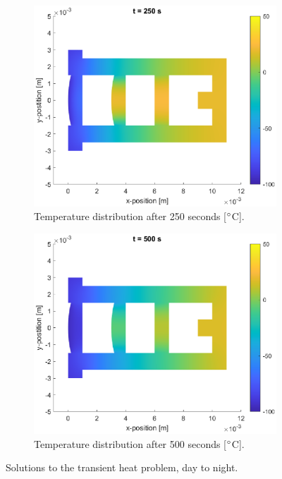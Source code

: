 \documentclass[a4paper,11pt]{article}
\begin{document}
\begin{figure}[H]
    \begin{subfigure}{0.45\linewidth}{
        \centering
        \includegraphics[width=1\linewidth]{bDN3.eps}
        \caption{Temperature distribution after 250 seconds [$\degree$C].}
        \label{sub:DN3}
    }\end{subfigure}
    \begin{subfigure}{0.45\linewidth}{
        \centering
        \includegraphics[width=1\linewidth]{bDN4.eps}
        \caption{Temperature distribution after 500 seconds [$\degree$C].}
        \label{sub:DN4}
    }\end{subfigure}
    \caption{Solutions to the transient heat problem, day to night.}
    \label{fig:trans_tempDN}
\end{figure}
\end{document}
